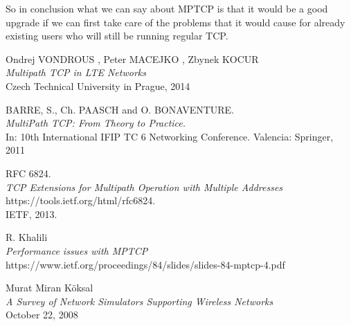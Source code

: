 \documentclass[11pt,twocolumn]{article}
\begin{document}
So in conclusion what we can say about MPTCP is that it would be a good upgrade if we can first take care of the problems that it would cause for already existing users who will still be running regular TCP.

\newpage

\begin{thebibliography}{9}

Ondrej VONDROUS , Peter MACEJKO , Zbynek KOCUR \\
\emph{Multipath TCP in LTE Networks}\\
Czech Technical University in Prague, 2014

BARRE, S., Ch. PAASCH and O. BONAVENTURE.\\
\emph{MultiPath TCP: From Theory to Practice.}\\
In: 10th International IFIP TC 6 Networking
Conference. Valencia: Springer, 2011

RFC 6824.  \\
\emph{TCP Extensions for Multipath Operation with Multiple Addresses} \\ 
https://tools.ietf.org/html/rfc6824.\\ IETF, 2013.

R. Khalili\\
\emph{Performance issues with MPTCP}\\
https://www.ietf.org/proceedings/84/slides/slides-84-mptcp-4.pdf

Murat Miran Köksal\\
\emph{A Survey of Network Simulators Supporting Wireless Networks} \\
October 22, 2008





\end{thebibliography}
\end{document}
